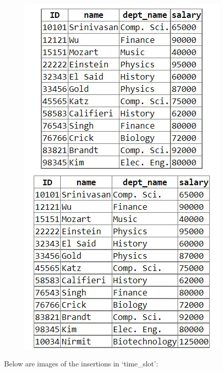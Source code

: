 \documentclass{article}
\begin{document}
\begin{figure}[!hbt]
    \centering
    \includegraphics[scale=0.87]{pics/insert-pic3.jpg}
    \label{fig:ins3}
\end{figure} \newpage \noindent
Below are images of the insertions in `time\_slot':
\end{document}
